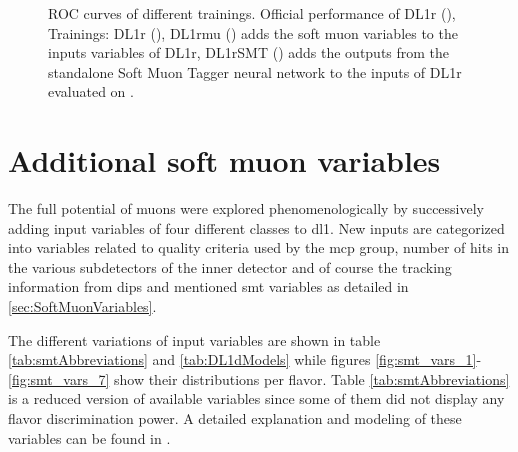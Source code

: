 \begin{figure}[]
  \centering
  \caption{ROC curves of different trainings. Official performance of DL1r (), Trainings: DL1r (), DL1rmu () adds the soft muon variables to the inputs variables of DL1r,  DL1rSMT () adds the outputs from the standalone Soft Muon Tagger neural network to the inputs of DL1r evaluated on \Zprime. }
  \label{fig:DL1rmu_vs_DL1r_SMT_z}
\end{figure}



\section{Additional soft muon variables}
The full potential of muons were explored phenomenologically by successively adding input variables of four different classes to \ac{dl1}. New inputs are categorized into variables related to quality criteria used by the \ac{mcp} group, number of hits in the various subdetectors of the inner detector and of course the tracking information from \ac{dips} and mentioned \ac{smt} variables as detailed in \ref{sec:SoftMuonVariables}.

The different variations of input variables are shown in table \ref{tab:smtAbbreviations} and \ref{tab:DL1dModels} while figures \ref{fig:smt_vars_1}-\ref{fig:smt_vars_7} show their distributions per flavor. Table \ref{tab:smtAbbreviations} is a reduced version of available variables since some of them did not display any flavor discrimination power. A detailed explanation and modeling of these variables can be found in \citep{Assamagan:1099953,Bugge:2665711}.

